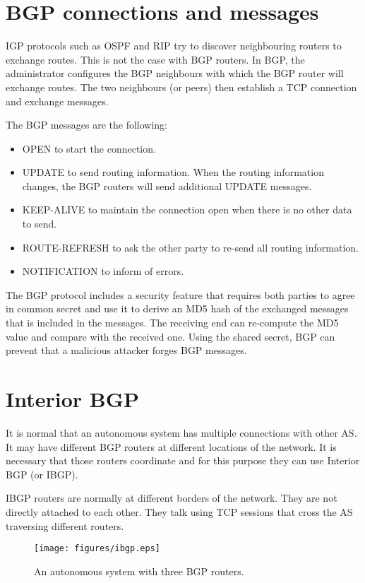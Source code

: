 \section{BGP connections and messages}

IGP protocols such as OSPF and RIP try to discover neighbouring routers to exchange routes.
This is not the case with BGP routers.
In BGP, the administrator configures the BGP neighbours with which the BGP router will exchange routes.
The two neighbours (or peers) then establish a TCP connection and exchange messages.

The BGP messages are the following:
\begin{itemize}
\item OPEN to start the connection.
\item UPDATE to send routing information. When the routing information changes, the BGP routers will send additional UPDATE messages.
\item KEEP-ALIVE to maintain the connection open when there is no other data to send.
\item ROUTE-REFRESH to ask the other party to re-send all routing information.
\item NOTIFICATION to inform of errors.
\end{itemize}

The BGP protocol includes a security feature that requires both parties to agree in common secret and use it to derive an MD5 hash of the exchanged messages that is included in the messages.
The receiving end can re-compute the MD5 value and compare with the received one.
Using the shared secret, BGP can prevent that a malicious attacker forges BGP messages.

\section{Interior BGP}

It is normal that an autonomous system has multiple connections with other AS.
It may have different BGP routers at different locations of the network.
It is necessary that those routers coordinate and for this purpose they can use Interior BGP (or IBGP).

IBGP routers are normally at different borders of the network.
They are not directly attached to each other.
They talk using TCP sessions that cross the AS traversing different routers.


\begin{figure}[!h]
\centering
\texttt{[image: figures/ibgp.eps]}
\caption{An autonomous system with three BGP routers.}
\label{fig:ibgp}
\end{figure}

